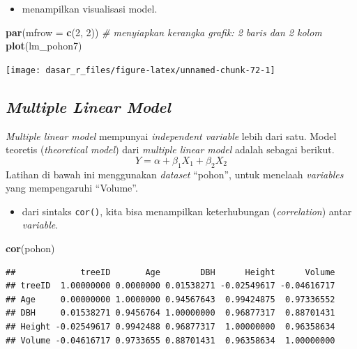 \documentclass[
  12pt,
  a4paper,
]{scrbook}
\newenvironment{Shaded}{\begin{snugshade}}{\end{snugshade}}
\newcommand{\CommentTok}[1]{\textcolor[rgb]{0.56,0.35,0.01}{\textit{#1}}}
\newcommand{\DataTypeTok}[1]{\textcolor[rgb]{0.13,0.29,0.53}{#1}}
\newcommand{\DecValTok}[1]{\textcolor[rgb]{0.00,0.00,0.81}{#1}}
\newcommand{\KeywordTok}[1]{\textcolor[rgb]{0.13,0.29,0.53}{\textbf{#1}}}
\newcommand{\NormalTok}[1]{#1}
\providecommand{\tightlist}{%
  \setlength{\itemsep}{0pt}\setlength{\parskip}{0pt}}
\begin{document}
\begin{itemize}
\tightlist
\item
  menampilkan visualisasi model.
\end{itemize}

\begin{Shaded}
\begin{Highlighting}[]
\KeywordTok{par}\NormalTok{(}\DataTypeTok{mfrow =} \KeywordTok{c}\NormalTok{(}\DecValTok{2}\NormalTok{, }\DecValTok{2}\NormalTok{))  }\CommentTok{# menyiapkan kerangka grafik: 2 baris dan 2 kolom}
\KeywordTok{plot}\NormalTok{(lm_pohon7)}
\end{Highlighting}
\end{Shaded}

\texttt{[image: dasar\_r\_files/figure-latex/unnamed-chunk-72-1]}

\hypertarget{multiple-linear-model}{%
\subsection{\texorpdfstring{\emph{Multiple Linear
Model}}{Multiple Linear Model}}\label{multiple-linear-model}}

\emph{Multiple linear model} mempunyai \emph{independent variable} lebih
dari satu. Model teoretis (\emph{theoretical model}) dari \emph{multiple
linear model} adalah sebagai berikut.
\[Y = \alpha + \beta_1X_1 + \beta_2X_2 \] Latihan di bawah ini
menggunakan \emph{dataset} ``pohon'', untuk menelaah \emph{variables}
yang mempengaruhi ``Volume''.

\begin{itemize}
\tightlist
\item
  dari sintaks \texttt{cor()}, kita bisa menampilkan keterhubungan
  (\emph{correlation}) antar \emph{variable}.
\end{itemize}

\begin{Shaded}
\begin{Highlighting}[]
\KeywordTok{cor}\NormalTok{(pohon)}
\end{Highlighting}
\end{Shaded}

\begin{verbatim}
##             treeID       Age        DBH      Height      Volume
## treeID  1.00000000 0.0000000 0.01538271 -0.02549617 -0.04616717
## Age     0.00000000 1.0000000 0.94567643  0.99424875  0.97336552
## DBH     0.01538271 0.9456764 1.00000000  0.96877317  0.88701431
## Height -0.02549617 0.9942488 0.96877317  1.00000000  0.96358634
## Volume -0.04616717 0.9733655 0.88701431  0.96358634  1.00000000
\end{verbatim}
\end{document}
